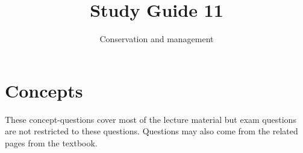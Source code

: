 \documentclass[nofonts, letterpaper]{tufte-handout}
\title{Study Guide 11}
\author{Conservation and management}
\date{} %
\begin{document}
\maketitle	%


\section{Concepts}

These concept-questions cover most of the lecture material but exam questions are not restricted to these questions. Questions may also come from the related pages from the textbook.\vspace{\baselineskip}
\end{document}
